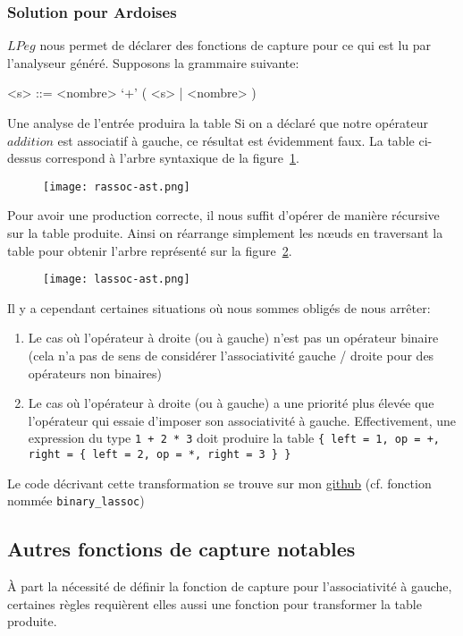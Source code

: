 \documentclass{article}
\begin{document}
\subsubsection{Solution pour Ardoises}
$LPeg$ nous permet de déclarer des fonctions de capture pour ce qui est lu par l'analyseur généré. Supposons la grammaire suivante:
\begin{grammar}
	<s> ::= <nombre> `+' ( <s> | <nombre> )
\end{grammar}
Une analyse de l'entrée  \noindent produira la table 
\noindent Si on a déclaré que notre opérateur $addition$ est associatif à gauche, ce résultat est évidemment faux. La table ci-dessus correspond à l'arbre syntaxique de la figure~\ref{fig:rassocast}. 
\begin{figure}[!h]
	\centering
	\texttt{[image: rassoc-ast.png]}
	\caption{}
	\label{fig:rassocast}
\end{figure}
Pour avoir une production correcte, il nous suffit d'opérer de manière récursive sur la table produite. Ainsi on réarrange simplement les nœuds en traversant la table pour obtenir l'arbre représenté sur la figure~\ref{fig:lassocast}.
\begin{figure}[h]
	\centering
	\texttt{[image: lassoc-ast.png]}
	\caption{}
	\label{fig:lassocast}
\end{figure}
Il y a cependant certaines situations où nous sommes obligés de nous arrêter:
\begin{enumerate}
	\item Le cas où l'opérateur à droite (ou à gauche) n'est pas un opérateur binaire (cela n'a pas de sens de considérer l'associativité gauche / droite pour des opérateurs non binaires)
	\item Le cas où l'opérateur à droite (ou à gauche) a une priorité plus élevée que l'opérateur qui essaie d'imposer son associativité à gauche. Effectivement, une expression du type \lstinline|1 + 2 * 3| doit produire la table \lstinline|{ left = 1, op = +, right = { left = 2, op = *, right = 3 } }|
\end{enumerate}
Le code décrivant cette transformation se trouve sur mon \underline{\href{https://github.com/LGabAnnell/formalisms/blob/f3cc67d58ef319d80d5895146f26f0b489c89d21/src/parser.lua\#L140}{github}} (cf. fonction nommée \lstinline|binary_lassoc|)
\subsection{Autres fonctions de capture notables}
À part la nécessité de définir la fonction de capture pour l'associativité à gauche, certaines règles requièrent elles aussi une fonction pour transformer la table produite.
\end{document}
